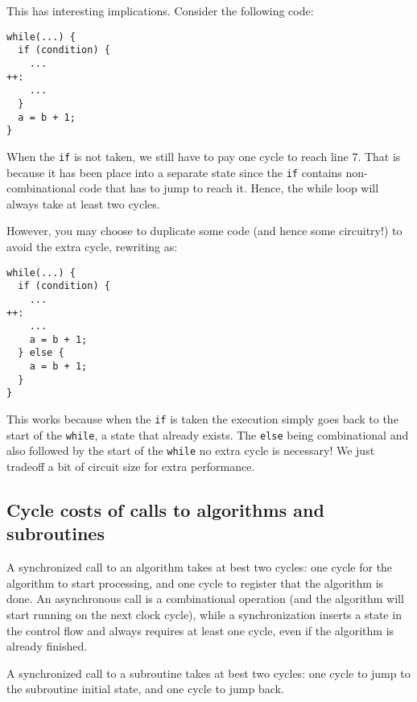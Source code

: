 \documentclass[a4]{article}
\begin{document}
This has interesting implications. Consider the following code:

\begin{verbatim}
while(...) {
  if (condition) {
    ...
++:
    ...    
  }
  a = b + 1;
}
\end{verbatim}

When the \texttt{if} is not taken, we still have to pay one cycle to reach line 7. That is because it has been place into a separate state since the \texttt{if} contains non-combinational code that has to jump to reach it. Hence, the while loop will always take at least two cycles.

However, you may choose to duplicate some code (and hence some circuitry!) to avoid the extra cycle, rewriting as:

\begin{verbatim}
while(...) {
  if (condition) {
    ...
++:
    ...    
    a = b + 1;
  } else {
    a = b + 1;
  }
}
\end{verbatim}

This works because when the \texttt{if} is taken the execution simply goes back to the start of the \texttt{while}, a state that already exists. The \texttt{else} being combinational and also followed by the start of the \texttt{while} no extra cycle is necessary! We just tradeoff a bit of circuit size for extra performance.


\subsection{Cycle costs of calls to algorithms and subroutines}

A synchronized call to an algorithm takes at best two cycles: one cycle for the algorithm to start processing, and one cycle to register that the algorithm is done. An asynchronous call is a combinational operation (and the algorithm will start running on the next clock cycle), while a synchronization inserts a state in the control flow and always requires at least one cycle, even if the algorithm is already finished.

A synchronized call to a subroutine takes at best two cycles: one cycle to jump to the subroutine initial state, and one cycle to jump back.

\vspace*{5mm}
\noindent
{}
\end{document}
